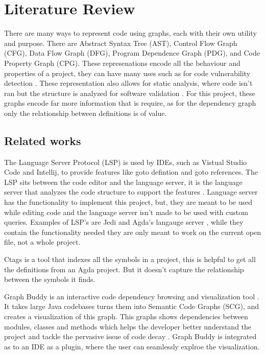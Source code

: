 
\chapter{Literature Review}


There are many ways to represent code using graphs, each with their own utility
and purpose. There are Abstract Syntax Tree (AST), Control Flow Graph (CFG),
Data Flow Graph (DFG), Program Dependence Graph (PDG), and Code Property Graph
(CPG). These represenations encode all the behaviour and properties of a
project, they can have many uses such as for code vulnerability detection
\cite{graph_for_code_vuln}. These representation also allows for static
analysis, where code isn't ran but the structure is analyzed for software
validation \cite{static_analysis}. For this project, these graphs encode far
more information that is require, as for the dependency graph only the
relationship between definitions is of value. 



\section{Related works}

The Language Server Protocol (LSP) is used by IDEs, such as Vistual Studio Code
and Intellij, to provide features like goto defintion and goto references. The
LSP sits between the code editor and the language server, it is the language
server that analyzes the code structure to support the features
\cite{LSP_implementation}. Language server has the functionality to implement
this project, but, they are meant to be used while editing code and the
language server isn't made to be used with custom queries. Examples of LSP's
are Jedi \cite{jedi_lsp} and Agda's langauge server \cite{agda_lsp}, while they
contain the functionality needed they are only meant to work on the current
open file, not a whole project.

Ctags \cite{ctags} is a tool that indexes all the symbols in a project, this is
helpful to get all the definitions from an Agda project. But it doesn't capture
the relationship between the symbols it finds.

Graph Buddy is an interactive code dependency browsing and visualization tool
\cite{graph_buddy}. It takes large Java codebases turns them into Semantic Code
Graphs (SCG), and creates a visualization of this graph. This graphs shows
dependencies between modules, classes and methods which helps the developer
better understand the project and tackle the pervasive issue of code decay
\cite{code_decay_evidence}. Graph Buddy is integrated as to an IDE as a plugin,
where the user can seamlessly explroe the visualization. 

